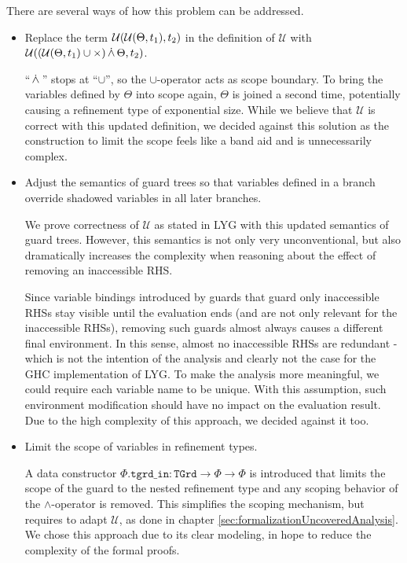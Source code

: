 There are several ways of how this problem can be addressed.
\begin{itemize}
    \item Replace the term $\mathcal{U}(\mathcal{U}(\Theta, t_1), t_2)$ in the definition of $\mathcal{U}$ with $\mathcal{U}((\mathcal{U}(\Theta, t_1) \cup \times) \,\dot{\wedge}\, \Theta, t_2)$.
    
        ``$\,\dot{\wedge}\,$'' stops at ``$\cup$'', so the $\cup$-operator acts as scope boundary.
        To bring the variables defined by $\Theta$ into scope again, $\Theta$ is joined a second time, potentially causing a refinement type of exponential size.
        While we believe that $\mathcal{U}$ is correct with this updated definition,
        we decided against this solution as the construction to limit the scope feels like a band aid and is unnecessarily complex.
    
    \item Adjust the semantics of guard trees so that variables defined in a branch override shadowed variables in all later branches.
    
        We prove correctness of $\mathcal{U}$ as stated in LYG with this updated semantics of guard trees.
        However, this semantics is not only very unconventional, but also dramatically increases the complexity
        when reasoning about the effect of removing an inaccessible RHS.
        
        Since variable bindings introduced by guards that guard only inaccessible RHSs stay visible
        until the evaluation ends (and are not only relevant for the inaccessible RHSs),
        removing such guards almost always causes a different final environment.
        In this sense, almost no inaccessible RHSs are redundant - which is not the intention of the analysis and clearly not the case for the GHC implementation of LYG. To make the analysis more meaningful, we could require each variable name to be unique.
        With this assumption, such environment modification should have no impact on the evaluation result.
        Due to the high complexity of this approach, we decided against it too.
    
    \item Limit the scope of variables in refinement types.
    
        A data constructor $\mathtt{Φ.tgrd\_in}:
        \mathtt{TGrd} \to Φ \to Φ$ is introduced that limits the scope of the guard to the nested refinement type and any scoping behavior of the $\land$-operator is removed.
        This simplifies the scoping mechanism, but requires to adapt $\mathcal{U}$, as done in chapter \ref{sec:formalizationUncoveredAnalysis}.
        We chose this approach due to its clear modeling, in hope to reduce the complexity of the formal proofs.
        
\end{itemize}

